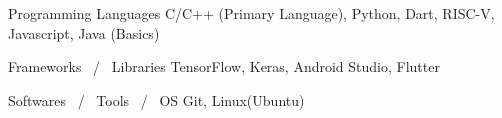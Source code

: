 

\begin{cvskills}

  \cvskill
    {Programming Languages} %
    {C/C++ (Primary Language), Python, Dart, RISC-V, Javascript, Java (Basics)} %


  \cvskill
    {Frameworks \, / \, Libraries} %
    {TensorFlow, Keras, Android Studio, Flutter} %

\cvskill
    {Softwares \, / \, Tools \, / \, OS} %
    {Git, Linux(Ubuntu)} %

\end{cvskills}

